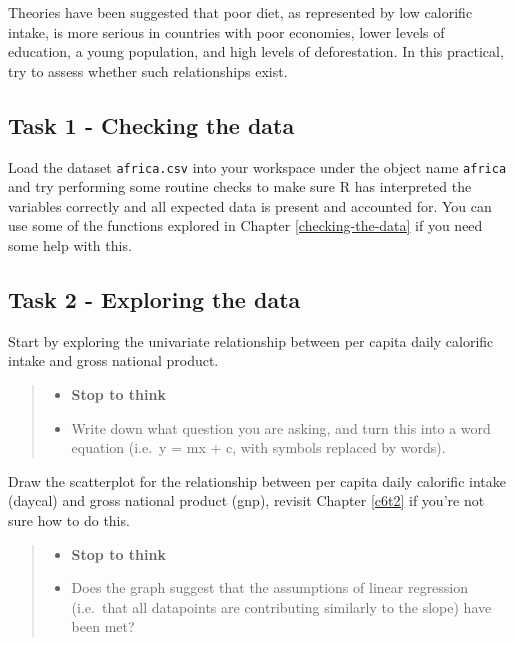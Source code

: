\documentclass[
]{book}
\providecommand{\tightlist}{%
  \setlength{\itemsep}{0pt}\setlength{\parskip}{0pt}}
\begin{document}
Theories have been suggested that poor diet, as represented by low calorific intake, is more serious in countries with poor economies, lower levels of education, a young population, and high levels of deforestation. In this practical, try to assess whether such relationships exist.

\subsection{Task 1 - Checking the data}\label{task-1---checking-the-data}

Load the dataset \texttt{africa.csv} into your workspace under the object name \texttt{africa} and try performing some routine checks to make sure R has interpreted the variables correctly and all expected data is present and accounted for. You can use some of the functions explored in Chapter \ref{checking-the-data} if you need some help with this.

\subsection{Task 2 - Exploring the data}\label{task-2---exploring-the-data}

Start by exploring the univariate relationship between per capita daily calorific intake and gross national product.

\begin{quote}
\begin{itemize}
\tightlist
\item
  \textbf{Stop to think}
\item
  Write down what question you are asking, and turn this into a word equation (i.e.~y = mx + c, with symbols replaced by words).
\end{itemize}
\end{quote}

Draw the scatterplot for the relationship between per capita daily calorific intake (daycal) and gross national product (gnp), revisit Chapter \ref{c6t2} if you're not sure how to do this.

\begin{quote}
\begin{itemize}
\tightlist
\item
  \textbf{Stop to think}
\item
  Does the graph suggest that the assumptions of linear regression (i.e.~that all datapoints are contributing similarly to the slope) have been met?
\end{itemize}
\end{quote}
\end{document}
